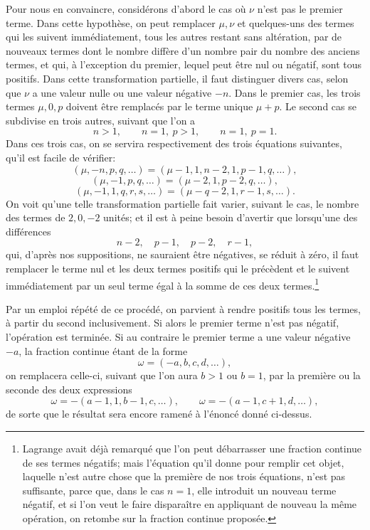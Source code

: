 \documentclass[11pt]{article}
\begin{document}
Pour nous en convaincre, considérons d'abord le cas où $\nu$ n'est pas le premier terme. Dans cette hypothèse, on peut remplacer $\mu,\nu$ et quelques-uns des termes qui les suivent immédiatement, tous les autres restant sans altération, par de nouveaux termes dont le nombre diffère d'un nombre pair du nombre des anciens termes, et qui, à l'exception du premier, lequel peut être nul ou négatif, sont tous positifs. Dans cette transformation partielle, il faut distinguer divers cas, selon que $\nu$ a une valeur nulle ou une valeur négative $-n$. Dans le premier cas, les trois termes $\mu,0,p$ doivent être remplacés par le terme unique $\mu+p$. Le second cas se subdivise en trois autres, suivant que l'on a
\[
  n>1,\qquad n=1,\ p>1,\qquad n=1,\ p=1.
\]
Dans ces trois cas, on se servira respectivement des trois équations suivantes, qu'il est facile de vérifier:
\[
 (\mu,-n,p,q,\ldots)=(\mu-1,1,n-2,1,p-1,q,\ldots),
\]
\[
 (\mu,-1,p,q,\ldots)=(\mu-2,1,p-2,q,\ldots),
\]
\[
 (\mu,-1,1,q,r,s,\ldots)=(\mu-q-2,1,r-1,s,\ldots).
\]
On voit qu'une telle transformation partielle fait varier, suivant le cas, le nombre des termes de $2,0,-2$ unités; et il est à peine besoin d'avertir que lorsqu'une des différences
\[
  n-2,\quad p-1,\quad p-2,\quad r-1,
\]
qui, d'après nos suppositions, ne sauraient être négatives, se réduit à zéro, il faut remplacer le terme nul et les deux termes positifs qui le précèdent et le suivent immédiatement par un seul terme égal à la somme de ces deux termes.\footnote{Lagrange avait déjà remarqué que l'on peut débarrasser une fraction continue de ses termes négatifs; mais l'équation qu'il donne pour remplir cet objet, laquelle n'est autre chose que la première de nos trois équations, n'est pas suffisante, parce que, dans le cas $n=1$, elle introduit un nouveau terme négatif, et si l'on veut le faire disparaître en appliquant de nouveau la même opération, on retombe sur la fraction continue proposée.}

Par un emploi répété de ce procédé, on parvient à rendre positifs tous les termes, à partir du second inclusivement. Si alors le premier terme n'est pas négatif, l'opération est terminée. Si au contraire le premier terme a une valeur négative $-a$, la fraction continue étant de la forme
\[
  \omega=(-a,b,c,d,\ldots),
\]
on remplacera celle-ci, suivant que l'on aura $b>1$ ou $b=1$, par la première ou la seconde des deux expressions
\[
  \omega=-(a-1,1,b-1,c,\ldots),\qquad
  \omega=-(a-1,c+1,d,\ldots),
\]
de sorte que le résultat sera encore ramené à l'énoncé donné ci-dessus.
\end{document}
